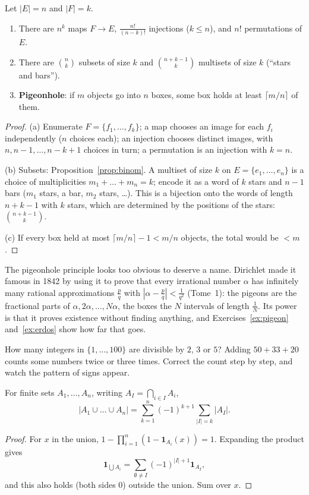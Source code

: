\begin{proposition}\label{prop:counts}
Let $|E|=n$ and $|F|=k$.
\begin{enumerate}[label=(\alph*)]
\item There are $n^k$ maps $F\to E$, $\frac{n!}{(n-k)!}$ injections ($k\le n$), and $n!$ permutations of $E$.
\item There are $\binom nk$ subsets of size $k$ and $\binom{n+k-1}k$ multisets of size $k$ (``stars and bars'').
\item \textbf{Pigeonhole}: if $m$ objects go into $n$ boxes, some box holds at least $\lceil m/n\rceil$ of them.
\end{enumerate}
\end{proposition}
\begin{proof}
(a) Enumerate $F=\{f_1,\dots,f_k\}$; a map chooses an image for each $f_i$ independently ($n$ choices each); an injection chooses distinct images, with $n,n-1,\dots,n-k+1$ choices in turn; a permutation is an injection with $k=n$.

(b) Subsets: Proposition~\ref{prop:binom}. A multiset of size $k$ on $E=\{e_1,\dots,e_n\}$ is a choice of multiplicities $m_1+\dots+m_n=k$; encode it as a word of $k$ stars and $n-1$ bars ($m_1$ stars, a bar, $m_2$ stars, \dots). This is a bijection onto the words of length $n+k-1$ with $k$ stars, which are determined by the positions of the stars: $\binom{n+k-1}k$.

(c) If every box held at most $\lceil m/n\rceil-1<m/n$ objects, the total would be $<m$.
\end{proof}

The pigeonhole principle looks too obvious to deserve a name. Dirichlet made it famous in 1842 by using it to prove that every irrational number $\alpha$ has infinitely many rational approximations $\frac pq$ with $\left|\alpha-\frac pq\right|<\frac1{q^2}$ (Tome~1): the pigeons are the fractional parts of $\alpha,2\alpha,\dots,N\alpha$, the boxes the $N$ intervals of length $\frac1N$. Its power is that it proves existence without finding anything, and Exercises~\ref{ex:pigeon} and~\ref{ex:erdos} show how far that goes.

\begin{think}
How many integers in $\{1,\dots,100\}$ are divisible by $2$, $3$ or $5$? Adding $50+33+20$ counts some numbers twice or three times. Correct the count step by step, and watch the pattern of signs appear.
\end{think}

\begin{theorem}\label{thm:incexc}
For finite sets $A_1,\dots,A_n$, writing $A_I=\bigcap_{i\in I}A_i$,
\[
\left|A_1\cup\dots\cup A_n\right|=\sum_{k=1}^n(-1)^{k+1}\sum_{|I|=k}|A_I|.
\]
\end{theorem}
\begin{proof}
For $x$ in the union, $1-\prod_{i=1}^n\left(1-\mathbf 1_{A_i}(x)\right)=1$. Expanding the product gives
\[\mathbf 1_{\bigcup A_i}=\sum_{\emptyset\ne I}(-1)^{|I|+1}\mathbf 1_{A_I},\]
and this also holds (both sides $0$) outside the union. Sum over $x$.
\end{proof}

